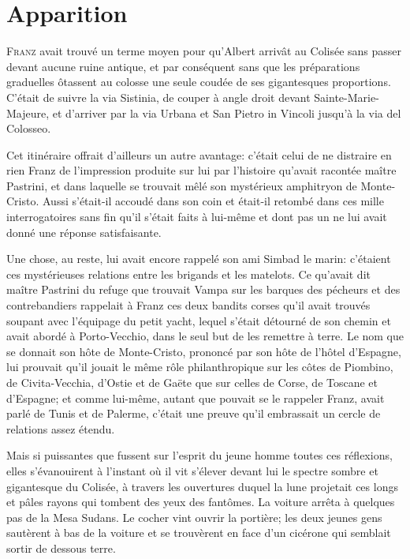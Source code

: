 \chapter{Apparition}

\lettrine{F}{ranz} avait trouvé un terme moyen pour qu'Albert arrivât au Colisée sans passer devant aucune ruine antique, et par conséquent sans que les préparations graduelles ôtassent au colosse une seule coudée de ses gigantesques proportions. C'était de suivre la via Sistinia, de couper à angle droit devant Sainte-Marie-Majeure, et d'arriver par la via Urbana et San Pietro in Vincoli jusqu'à la via del Colosseo. 

Cet itinéraire offrait d'ailleurs un autre avantage: c'était celui de ne distraire en rien Franz de l'impression produite sur lui par l'histoire qu'avait racontée maître Pastrini, et dans laquelle se trouvait mêlé son mystérieux amphitryon de Monte-Cristo. Aussi s'était-il accoudé dans son coin et était-il retombé dans ces mille interrogatoires sans fin qu'il s'était faits à lui-même et dont pas un ne lui avait donné une réponse satisfaisante. 

Une chose, au reste, lui avait encore rappelé son ami Simbad le marin: c'étaient ces mystérieuses relations entre les brigands et les matelots. Ce qu'avait dit maître Pastrini du refuge que trouvait Vampa sur les barques des pécheurs et des contrebandiers rappelait à Franz ces deux bandits corses qu'il avait trouvés soupant avec l'équipage du petit yacht, lequel s'était détourné de son chemin et avait abordé à Porto-Vecchio, dans le seul but de les remettre à terre. Le nom que se donnait son hôte de Monte-Cristo, prononcé par son hôte de l'hôtel d'Espagne, lui prouvait qu'il jouait le même rôle philanthropique sur les côtes de Piombino, de Civita-Vecchia, d'Ostie et de Gaëte que sur celles de Corse, de Toscane et d'Espagne; et comme lui-même, autant que pouvait se le rappeler Franz, avait parlé de Tunis et de Palerme, c'était une preuve qu'il embrassait un cercle de relations assez étendu. 

Mais si puissantes que fussent sur l'esprit du jeune homme toutes ces réflexions, elles s'évanouirent à l'instant où il vit s'élever devant lui le spectre sombre et gigantesque du Colisée, à travers les ouvertures duquel la lune projetait ces longs et pâles rayons qui tombent des yeux des fantômes. La voiture arrêta à quelques pas de la Mesa Sudans. Le cocher vint ouvrir la portière; les deux jeunes gens sautèrent à bas de la voiture et se trouvèrent en face d'un cicérone qui semblait sortir de dessous terre. 


